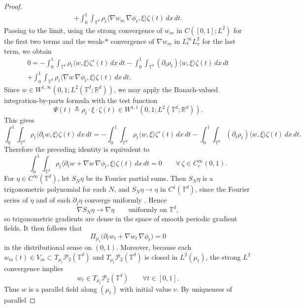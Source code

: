 \documentclass[11pt]{article}
\begin{document}
\begin{proof}
\begin{multline*}
    +\int_0^1\int_{\mathbb T^d}
    \rho_t\langle \nabla w_m\,\nabla\phi_t,\xi\rangle \zeta(t)\,dx\,dt.
    \end{multline*}
    Passing to the limit, using the strong convergence of $w_m$ in $C([0,1];L^2)$ for the first two terms
    and the weak-$*$ convergence of $\nabla w_m$ in $L^\infty_tL^2_x$ for the last term, we obtain
    \begin{multline*}
    0
    =
    -\int_0^1\int_{\mathbb T^d}
    \rho_t\langle w,\xi\rangle \zeta'(t)\,dx\,dt
    -\int_0^1\int_{\mathbb T^d}
    (\partial_t\rho_t)\langle w,\xi\rangle \zeta(t)\,dx\,dt \\
    +\int_0^1\int_{\mathbb T^d}
    \rho_t\langle \nabla w\,\nabla\phi_t,\xi\rangle \zeta(t)\,dx\,dt.
    \end{multline*}
        Since $w \in W^{1,\infty}(0,1;L^2(\mathbb T^d;\mathbb R^d))$, we may apply
    the Banach-valued integration-by-parts formula with the test function
    \[
    \Psi(t) \triangleq \rho_t \cdot \xi\cdot \zeta(t)
    \in W^{1,1}(0,1;L^2(\mathbb T^d;\mathbb R^d)).
    \]
    This gives
    \[
    \int_0^1\int_{\mathbb T^d}
    \rho_t \langle \partial_t w,\xi\rangle \zeta(t)\,dx\,dt
    =
    -\int_0^1\int_{\mathbb T^d}
    \rho_t\langle w,\xi\rangle \zeta'(t)\,dx\,dt
    -\int_0^1\int_{\mathbb T^d}
    (\partial_t\rho_t)\langle w,\xi\rangle \zeta(t)\,dx\,dt.
    \]
    Therefore the preceding identity is equivalent to
    \[
    \int_0^1\int_{\mathbb T^d}
    \rho_t \big\langle \partial_t w + \nabla w\,\nabla\phi_t,\xi\big\rangle
    \zeta(t)\,dx\,dt = 0
    \qquad\forall\,\zeta\in C_c^\infty(0,1).
    \]
    For $\eta\in C^\infty(\mathbb T^d)$, let $S_N\eta$ be its Fourier partial sums. Then
    $S_N\eta$ is a trigonometric polynomial for each $N$, and $S_N\eta\to\eta$ in
    $C^1(\mathbb T^d)$, since the Fourier series of $\eta$ and of each $\partial_j\eta$
    converge uniformly \citep[Proposition 1.6]{casselman2016fourier}. Hence
    \[
    \nabla S_N\eta \to \nabla\eta
    \qquad\text{uniformly on }\mathbb T^d,
    \]
    so trigonometric gradients are dense in the space of smooth periodic gradient fields.
    It then follows that
    \[
    \Pi_{\mu_t}\bigl(\partial_t w_t+\nabla w_t\,\nabla\phi_t\bigr)=0
    \]
    in the distributional sense on $(0,1)$. Moreover, because each $w_m(t)\in V_m\subset T_{\mu_t}\mathcal P_2(\mathbb T^d)$
    and $T_{\mu_t}\mathcal P_2(\mathbb T^d)$ is closed in $L^2(\mu_t)$, the strong $L^2$ convergence
    implies
    \[
    w_t\in T_{\mu_t}\mathcal P_2(\mathbb T^d)
    \qquad\forall t\in[0,1].
    \]
    Thus $w$ is a parallel field along $(\mu_t)$ with initial value $v$. By uniqueness of parallel

\end{proof}
\end{document}
